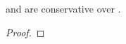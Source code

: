 %

\begin{theorem}
    \label{tb-utb-cons}
     and  are conservative over .
\end{theorem}

\begin{proof} \end{proof}
